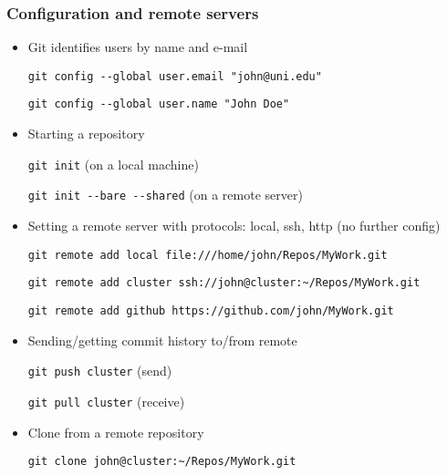 \documentclass[xcolor=dvipsnames,10pt]{beamer}
\begin{document}
\begin{frame}
 \frametitle{Configuration and remote servers}
 
 \begin{itemize}
  \item<1> Git identifies users by name and e-mail
  
  \texttt{git config -{}-global user.email "john@uni.edu"}
  
  \texttt{git config -{}-global user.name "John Doe"}
  \vspace*{0.2cm}

  \item<2> Starting a repository
  
  \texttt{git init} (on a local machine)
  
  \texttt{git init -{}-bare -{}-shared} (on a remote server)
  \vspace*{0.2cm}
  
  \item<3,6> Setting a remote server with protocols: local, ssh, http (no further config)
  
  \texttt{git remote add {\color{blue}local} file:///home/john/Repos/MyWork.git}
  
  \begin{minipage}{1.1\textwidth}
  \texttt{git remote add {\color{blue}cluster} ssh://john@cluster:\textasciitilde/Repos/MyWork.git}
  \end{minipage}

  \alert<6>{
\texttt{git remote add {\color{blue}github} https://github.com/john/MyWork.git}}
  \vspace*{0.2cm}
  
  \item<4> Sending/getting commit history to/from remote
  
  \texttt{git push {\color{blue}cluster}} (send)
  
  \texttt{git pull {\color{blue}cluster}} (receive)
  \vspace*{0.2cm}
  
  \item<5> Clone from a remote repository
  
  \texttt{git clone john@cluster:\textasciitilde/Repos/MyWork.git}
  
 \end{itemize}

\end{frame}
\end{document}
